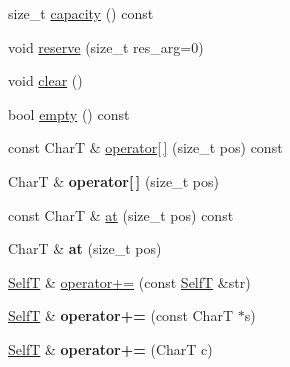 \begin{CompactItemize}
\item 
size\_\-t \hyperlink{classvector__string_0831bcf35fac1ef12692f7aade586f7b}{capacity} () const 
\item 
void \hyperlink{classvector__string_6499804dfd9b47e4fd747ccd982c20eb}{reserve} (size\_\-t res\_\-arg=0)
\item 
void \hyperlink{classvector__string_f5c9e2462a6d6d5eac6cbf0246ba957f}{clear} ()
\item 
bool \hyperlink{classvector__string_1b6ed56a2ebb354a819c4830ebb6c23b}{empty} () const 
\item 
const CharT \& \hyperlink{classvector__string_e845c248f0acdf57afc6628f43cbe14a}{operator\mbox{[}$\,$\mbox{]}} (size\_\-t pos) const 
\item 
\hypertarget{classvector__string_7f24c472b959ea7811105c6482872b6d}{
CharT \& \textbf{operator\mbox{[}$\,$\mbox{]}} (size\_\-t pos)}
\label{classvector__string_7f24c472b959ea7811105c6482872b6d}

\item 
const CharT \& \hyperlink{classvector__string_e262ba5e7759fb7e570c459c2ec064ce}{at} (size\_\-t pos) const 
\item 
\hypertarget{classvector__string_c3b73fb550c715f51e003f33c2f9bd4e}{
CharT \& \textbf{at} (size\_\-t pos)}
\label{classvector__string_c3b73fb550c715f51e003f33c2f9bd4e}

\item 
\hyperlink{classvector__string}{SelfT} \& \hyperlink{classvector__string_1ec6b1fc1e84f88d93a40084e4e01cef}{operator+=} (const \hyperlink{classvector__string}{SelfT} \&str)
\item 
\hypertarget{classvector__string_b59ec2a55bf01cf27f01a56a42bd3ea8}{
\hyperlink{classvector__string}{SelfT} \& \textbf{operator+=} (const CharT $\ast$s)}
\label{classvector__string_b59ec2a55bf01cf27f01a56a42bd3ea8}

\item 
\hypertarget{classvector__string_1b09004d55f08e6818f0690d4a8e4a64}{
\hyperlink{classvector__string}{SelfT} \& \textbf{operator+=} (CharT c)}
\label{classvector__string_1b09004d55f08e6818f0690d4a8e4a64}


\end{CompactItemize}

